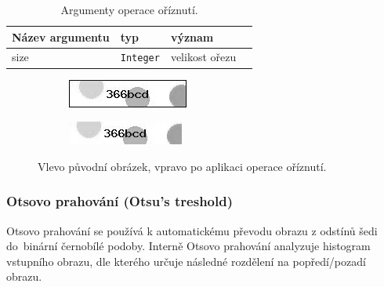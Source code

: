 \documentclass[
  field=ainfp,
  master=true,
  biblatex,
  sourcecodes=false,
  theorems=false,
  glossaries,
  index
]{kidiplom}
\begin{document}
\begin{table}[H]
\centering
\begin{tabular}{|l|l|l|l|}
\hline
\textbf{Název argumentu} & \textbf{typ} & \textbf{význam}
\\ \hline
size & \texttt{Integer} & velikost ořezu
\\ \hline
\end{tabular}
\caption{Argumenty operace oříznutí.}
\end{table}

\begin{figure}[H]
\centering
\begin{subfigure}{.5\textwidth}
  \centering
  \includegraphics[width=.8\linewidth]{images/crop_original.png}
\end{subfigure}%
\begin{subfigure}{.5\textwidth}
  \centering
  \includegraphics[width=.8\linewidth]{images/crop_result.png}
\end{subfigure}
\caption{Vlevo původní obrázek, vpravo po aplikaci operace oříznutí.}
\label{fig:crop_example}
\end{figure}

\subsubsection*{Otsovo prahování (Otsu's treshold)}
Otsovo prahování se používá k automatickému převodu obrazu z odstínů šedi do~binární černobílé podoby. Interně Otsovo prahování analyzuje histogram vstup\-ního obrazu, dle kterého určuje následné rozdělení na popředí/pozadí obrazu. 
\end{document}
